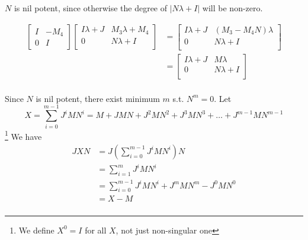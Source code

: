 \documentclass{article}
\newcommand{\0}{\mathbf{0}}
\begin{document}
$N$ is nil potent, since otherwise the degree of $|N\lambda+I|$ will be non-zero.

\begin{align*}
    \begin{bmatrix}I&-M_4\\0&I\end{bmatrix}\begin{bmatrix}I\lambda+J&M_3\lambda+M_4\\0&N\lambda+I\\\end{bmatrix}
    &=\begin{bmatrix}I\lambda+J&(M_3-M_4N)\lambda\\0&N\lambda+I\\\end{bmatrix}\\
    &=\begin{bmatrix}I\lambda+J&M\lambda\\0&N\lambda+I\\\end{bmatrix}\\
\end{align*}

Since $N$ is nil potent, there exist minimum $m$ s.t. $N^m=0$.
Let
\begin{equation*}
    X = \sum_{i=0}^{m-1}J^iMN^i = M + JMN + J^2MN^2 + J^3MN^3 + \dots + J^{m-1}MN^{m-1}
\end{equation*} \footnote{We define $X^0=I$ for all $X$, not just non-singular one}
We have
\begin{align*}
    JXN
    &= J(\sum_{i=0}^{m-1}J^iMN^i)N\\
    &= \sum_{i=1}^{m}J^iMN^i\\
    &= \sum_{i=0}^{m-1}J^iMN^i + J^mMN^m - J^0MN^0\\
    &= X - M\\
\end{align*}
\end{document}
